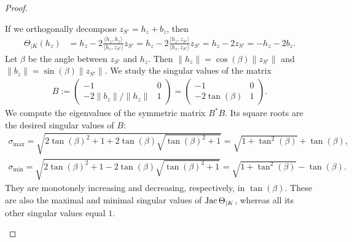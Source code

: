 \documentclass[10pt,letterpaper]{article}
\begin{document}
\begin{proof}
\begin{itemize}
        If we orthogonally decompose $z_{S'} = h_z + b_z$, then 
        \begin{align*}
            \Theta_{|K}( h_z ) 
            &= 
            h_z
            - 
            2 \frac{\langle h_z, h_z \rangle}{\langle h_z, z_{S'} \rangle} z_{S'}
            = 
            h_z
            - 
            2 \frac{\langle h_z, z_{S'} \rangle}{\langle h_z, z_{S'} \rangle} z_{S'}
            = 
            h_z
            - 
            2 z_{S'}
            = 
            - h_{z}
            - 
            2 b_{z}
            .
        \end{align*}
        Let $\beta$ be the angle between $z_{S'}$ and $h_{z}$. 
        Then $\| h_z \| = \cos(\beta) \|z_{S'}\|$ and $\| b_z \| = \sin(\beta) \|z_{S'}\|$. 
        We study the singular values of the matrix 
        \begin{align*}
            B 
            := 
            \begin{pmatrix}
            -1                 & 0
            \\ 
            -2 \|b_z\|/\|h_z\| & 1
            \end{pmatrix}
            =
            \begin{pmatrix}
            -1             & 0
            \\ 
            -2 \tan(\beta) & 1
            \end{pmatrix}
            .
        \end{align*}
        We compute the eigenvalues of the symmetric matrix $B^{\ast} B$. 
        Its square roots are the desired singular values of $B$:
        \begin{align*}
            \sigma_{\max} = \sqrt{ 2\tan(\beta)^2 + 1 + 2 \tan(\beta) \sqrt{ \tan(\beta)^2 + 1 } } = \sqrt{ 1 + \tan^{2}(\beta) } + \tan(\beta)
            ,
            \\
            \sigma_{\min} = \sqrt{ 2\tan(\beta)^2 + 1 - 2 \tan(\beta) \sqrt{ \tan(\beta)^2 + 1 } } = \sqrt{ 1 + \tan^{2}(\beta) } - \tan(\beta)
            .
        \end{align*}
        They are monotonely increasing and decreasing, respectively, in $\tan(\beta)$. 
        These are also the maximal and minimal singular values of $\operatorname{{\rm Jac}}\Theta_{|K}$,
        whereas all its other singular values equal $1$. 
        

\end{itemize}
\end{proof}
\end{document}
